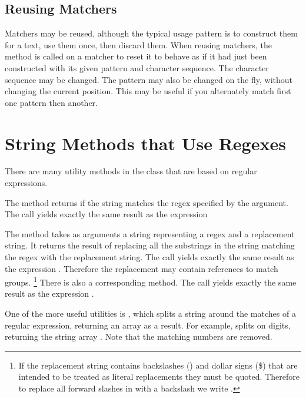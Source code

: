 \subsection{Reusing Matchers}

Matchers may be reused, although the typical usage pattern
is to construct them for a text, use them once, then discard them.
When reusing matchers, the  method is called on a
matcher to reset it to behave as if it had just been constructed with
its given pattern and character sequence.
The character sequence may
be changed.  The pattern may also be changed on the fly, without
changing the current position.  This may be useful if you alternately
match first one pattern then another.

\section{String Methods that Use Regexes}

There are many utility methods in the  class that
are based on regular expressions.   

The method  returns  if the string
matches the regex specified by the argument. 
The call  yields exactly the same result as the expression

The method  takes as arguments
a string representing a regex and a replacement string.
It returns the result
of replacing all the substrings in the string matching the regex
with the replacement string.
The call  yields exactly the same result as the expression
.
Therefore the replacement may contain references to match groups.%
%
\footnote{ 
If the replacement string contains backslashes (\bk) and
dollar signs (\$) that are intended to be treated as literal
replacements they must be quoted.  Therefore to replace all forward
slashes in  with a backslash we write
.
}
%
There is also a corresponding  method.
The call  yields exactly the same result as the expression
.

One of the more useful utilities is , which splits
a string around the matches of a regular expression, returning an
array as a result.  For example,
 splits on digits, returning
the string array .  Note that the
matching numbers are removed.

